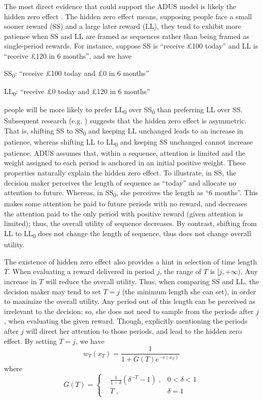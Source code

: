 \documentclass[
  12pt,
]{article}
\begin{document}
The most direct evidence that could support the ADUS model is likely the
hidden zero effect \citep{magen_hidden-zero_2008}. The hidden zero
effect means, supposing people face a small sooner reward (SS) and a
large later reward (LL), they tend to exhibit more patience when SS and
LL are framed as sequences rather than being framed as single-period
rewards. For instance, suppose SS is ``receive £100 today'' and LL is
``receive £120 in 6 months'', and we have

SS\textsubscript{0}: ``receive £100 today and £0 in 6 months''

LL\textsubscript{0}: ``receive £0 today and £120 in 6 months''

people will be more likely to prefer LL\textsubscript{0} over
SS\textsubscript{0} than preferring LL over SS. Subsequent research
(e.g. \citet{read_value_2017}) suggests that the hidden zero effect is
asymmetric. That is, shifting SS to SS\textsubscript{0} and keeping LL
unchanged leads to an increase in patience, whereas shifting LL to
LL\textsubscript{0} and keeping SS unchanged cannot increase patience.
ADUS assumes that, within a sequence, attention is limited and the
weight assigned to each period is anchored in an initial positive
weight. These properties naturally explain the hidden zero effect. To
illustrate, in SS, the decision maker perceives the length of sequence
as ``today'' and allocate no attention to future. Whereas, in
SS\textsubscript{0}, she perceives the length as ``6 months''. This
makes some attention be paid to future periods with no reward, and
decreases the attention paid to the only period with positive reward
(given attention is limited); thus, the overall utility of sequence
decreases. By contrast, shifting from LL to LL\textsubscript{0} does not
change the length of sequence, thus does not change overall utility.

The existence of hidden zero effect also provides a hint in selection of
time length \(T\). When evaluating a reward delivered in period \(j\),
the range of \(T\) is \([j,+\infty)\). Any increase in \(T\) will reduce
the overall utility. Thus, when comparing SS and LL, the decision maker
may tend to set \(T=j\) (the minimum length she can set), in order to
maximize the overall utility. Any period out of this length can be
perceived as irrelevant to the decision; so, she does not need to sample
from the periods after \(j\), when evaluating the given reward. Though,
explicitly mentioning the periods after \(j\) will direct her attention
to those periods, and lead to the hidden zero effect. By setting
\(T=j\), we
have\[ w_T(x_T) = \frac{1}{1+G(T)e^{-v(x_T)}} \]where\[ G(T) = \left\{ \begin{aligned} & \frac{1}{1-\delta}(\delta^{-T}-1) \; ,& 0<\delta<1\\ & T\; ,& \delta=1\ \end{aligned} \right. \]
\end{document}
